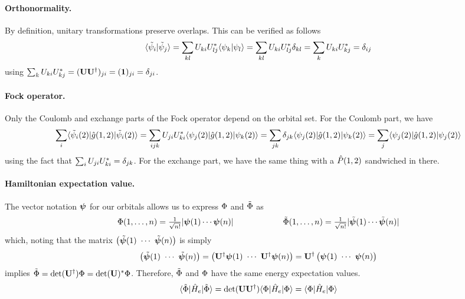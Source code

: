 \documentclass[11pt]{article}
\numberwithin{equation}{section}
\begin{document}
\paragraph{Orthonormality.}
By definition, unitary transformations preserve overlaps.
This can be verified as follows
\begin{align*}
  \langle\tilde{\psi }_i|\tilde{\psi }_j\rangle
=
\sum_{kl}
  U_{ki}U_{lj}^*
  \langle\psi _k|\psi _l\rangle
=
\sum_{kl}
  U_{ki}U_{lj}^*
  \delta _{kl}
=
\sum_k
  U_{ki}U_{kj}^*
=
  \delta _{ij}
\end{align*}
using $\sum_k U_{ki}U_{kj}^*=(\mathbf{U}\mathbf{U}^\dagger)_{ji}=(\mathbf{1})_{ji}=\delta _{ji}$.

\paragraph{Fock operator.}
Only the Coulomb and exchange parts of the Fock operator depend on the orbital set.
For the Coulomb part, we have
{\small\begin{align*}
\sum_i
  \langle\tilde{\psi }_i(2)|\hat{g}(1,2)|\tilde{\psi }_i(2)\rangle
=
\sum_{ijk}
  U_{ji}U_{ki}^*
  \langle\psi _j(2)|\hat{g}(1,2)|\psi _k(2)\rangle
=
\sum_{jk}
  \delta _{jk}
  \langle\psi _j(2)|\hat{g}(1,2)|\psi _k(2)\rangle
=
\sum_j
  \langle\psi _j(2)|\hat{g}(1,2)|\psi _j(2)\rangle
\end{align*} \underline{}}%
using the fact that $\sum_i U_{ji}U_{ki}^*=\delta _{jk}$.
For the exchange part, we have the same thing with a $\hat{P}(1,2)$ sandwiched in there.

\paragraph{Hamiltonian expectation value.}
The vector notation $\bm\y$ for our orbitals allows us to express $\Phi $ and $\tilde{\Phi }$ as
\begin{align*}
  \F(1,\ld,n)
=
  \tfrac{1}{\sqrt{n!}}
  |\bm\y(1)\cd\bm\y(n)|
\sp\sp
  \tl\F(1,\ld,n)
=
  \tfrac{1}{\sqrt{n!}}
  |\tl{\bm\y}(1)\cd\tl{\bm\y}(n)|
\end{align*}
which, noting that the matrix $\ma{\tl{\bm\y}(1)\ \cd\ \tl{\bm\y}(n)}$ is simply
\begin{align*}
  \ma{\tl{\bm\y}(1)\ \cd\ \tl{\bm\y}(n)}
=
  \ma{\bo{U}\dg\bm\y(1)\ \cd\ \bo{U}\dg\bm\y(n)}
=
  \bo{U}\dg\ma{\bm\y(1)\ \cd\ \bm\y(n)}
\end{align*}
implies $\tilde{\Phi }=\det(\mathbf{U}^\dagger)\Phi =\det(\mathbf{U})^*\Phi $.
Therefore, $\tilde{\Phi }$ and $\Phi $ have the same energy expectation values.
\begin{align}
  \langle\tilde{\Phi }|\hat{H}_e|\tilde{\Phi }\rangle
=
  \det(\mathbf{U}\mathbf{U}^\dagger)\langle\Phi |\hat{H}_e|\Phi \rangle
=
  \langle\Phi |\hat{H}_e|\Phi \rangle
\end{align}
\end{document}
